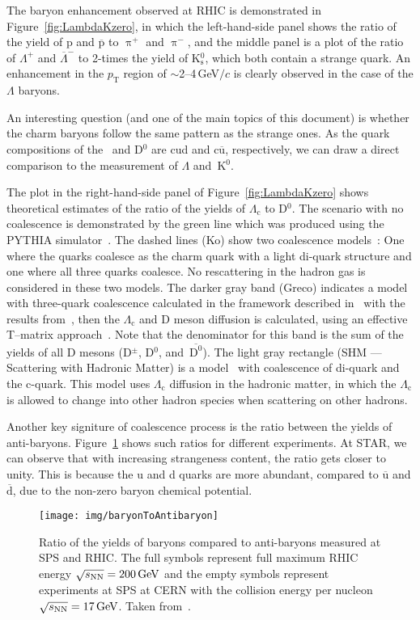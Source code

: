 The baryon enhancement observed at RHIC is demonstrated in Figure~\ref{fig:LambdaKzero}, in which the left-hand-side panel shows the ratio of the yield of p and $\overline{\mathrm{p}}$ to $\uppi^+$ and $\uppi^-$, and the middle panel is a plot of the ratio of $\Lambda^+$ and $\overline{\Lambda}^-$ to 2-times the yield of K$^0_\mathrm{s}$, which both contain a strange quark. An enhancement in the $p_\mathrm{T}$ region of $\sim$2--4$\,$GeV$/c$ is clearly observed in the case of the $\Lambda$ baryons. 

An interesting question (and one of the main topics of this document) is whether the charm baryons follow the same pattern as the strange ones. As the quark compositions of the \Lambdac\ and D$^0$ are cud and c$\overline{\mathrm{u}}$, respectively, we can draw a direct comparison to the measurement of $\Lambda$ and~K$^0$.

The plot in the right-hand-side panel of Figure~\ref{fig:LambdaKzero} shows theoretical estimates of the ratio of the yields of $\Lambda_\mathrm{c}$ to D$^0$. The scenario with no coalescence is demonstrated by the green line which was produced using the PYTHIA simulator~\cite{PYTHIA}. The dashed lines (Ko) show two coalescence models~\cite{LcCoalescence_OhKoLeeYasui}: One where the  quarks coalesce as the charm quark with a light di-quark structure and one where all three quarks coalesce. No rescattering in the hadron gas is considered in these two models. The darker gray band (Greco) indicates a model with three-quark coalescence calculated in the framework described in~\cite{Greco_framework} with the results from~\cite{Greco_results}, then the $\Lambda_\mathrm{c}$ and D meson diffusion is calculated, using an effective T--matrix approach~\cite{Ghosh_Lc_rescattering}. Note that the denominator for this band is the sum of the yields of all D mesons (D$^\pm$, D$^0$, and~$\mathrm{\overline{D^0}}$). The light gray rectangle (SHM --- Scattering with Hadronic Matter) is a model~\cite{SHM} with coalescence of di-quark and the c-quark. This model uses $\Lambda_\mathrm{c}$ diffusion in the hadronic matter, in which the $\Lambda_\mathrm{c}$ is allowed to change into other hadron species when scattering on other hadrons.

Another key signiture of coalescence process is the ratio between the yields of anti-baryons. Figure~\ref{fig:BtoAntiB} shows such ratios for different experiments. At STAR, we can observe that with increasing strangeness content, the ratio gets closer to unity. This is because the u and d quarks are more abundant, compared to $\overline{\mathrm{u}}$ and $\overline{\mathrm{d}}$, due to the non-zero baryon chemical potential. 

\begin{figure}
\centering
\texttt{[image: img/baryonToAntibaryon]}
\caption{Ratio of the yields of baryons compared to anti-baryons measured at SPS and RHIC\@. The full symbols represent full maximum RHIC energy $\sqrt{s_\text{NN}} = \SI{200}{GeV}$ and the empty symbols represent experiments at SPS at CERN with the collision energy per nucleon $\sqrt{s_\text{NN}} = \SI{17}{GeV}$. Taken from~\cite{BtoAntiB}.}
\label{fig:BtoAntiB}
\end{figure}

